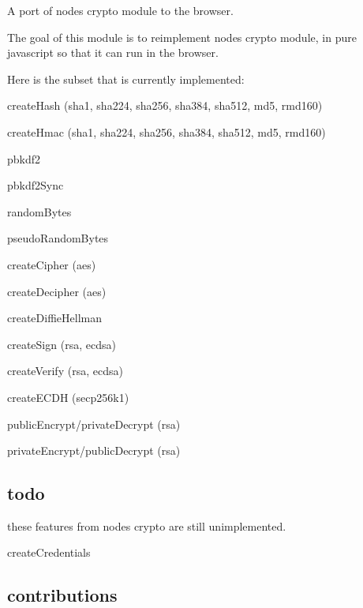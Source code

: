 A port of node\textquotesingle{}s {\ttfamily crypto} module to the browser.

\href{https://travis-ci.org/crypto-browserify/crypto-browserify}{\tt } \href{https://github.com/feross/standard}{\tt } \href{https://saucelabs.com/u/crypto-browserify}{\tt }

The goal of this module is to reimplement node\textquotesingle{}s crypto module, in pure javascript so that it can run in the browser.

Here is the subset that is currently implemented\+:


\begin{DoxyItemize}
\item create\+Hash (sha1, sha224, sha256, sha384, sha512, md5, rmd160)
\item create\+Hmac (sha1, sha224, sha256, sha384, sha512, md5, rmd160)
\item pbkdf2
\item pbkdf2\+Sync
\item random\+Bytes
\item pseudo\+Random\+Bytes
\item create\+Cipher (aes)
\item create\+Decipher (aes)
\item create\+Diffie\+Hellman
\item create\+Sign (rsa, ecdsa)
\item create\+Verify (rsa, ecdsa)
\item create\+E\+C\+DH (secp256k1)
\item public\+Encrypt/private\+Decrypt (rsa)
\item private\+Encrypt/public\+Decrypt (rsa)
\end{DoxyItemize}

\subsection*{todo}

these features from node\textquotesingle{}s {\ttfamily crypto} are still unimplemented.


\begin{DoxyItemize}
\item create\+Credentials
\end{DoxyItemize}

\subsection*{contributions}

